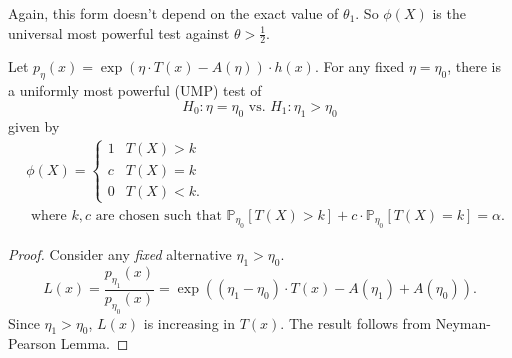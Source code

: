 \documentclass[a4paper]{article}
\begin{document}
\begin{eg}
\begin{center}
	\end{center}
\end{eg}

\begin{remark}
		Again, this form doesn't depend on the exact value of $\theta_1$. So $\phi(X)$ is the universal most powerful test against $\theta > \frac{1}{2}$.
\end{remark}

\begin{thm}
	Let $p_{\eta}(x) = \exp(\eta \cdot T(x) - A(\eta)) \cdot h(x)$. For any fixed $\eta = \eta_0$, there is a uniformly most powerful (UMP) test of
	\begin{equation*}
		H_0: \eta = \eta_0 \text{ vs. } H_1: \eta_1 > \eta_0
	\end{equation*}
	given by
	\begin{equation}
		\begin{aligned}
			& \phi(X) = \left\{
			\begin{array}{ll}
				1 & T(X) > k \\
				c & T(X) = k \\
				0 & T(X) < k.
			\end{array}
			\right.	\\
			& \text{ where $k,c$ are chosen such that } \mathbb{P}_{\eta_0}[T(X) > k] + c \cdot \mathbb{P}_{\eta_0}[T(X) = k] = \alpha.
		\end{aligned}
	\end{equation}
\end{thm}

\begin{proof}
	Consider any \emph{fixed} alternative $\eta_1 > \eta_0$.
	\begin{equation*}
		L(x) = \frac{p_{\eta_1}(x)}{p_{\eta_0}(x)} = \exp((\eta_1 - \eta_0) \cdot T(x) - A(\eta_1) + A(\eta_0)).
	\end{equation*}
	Since $\eta_1 > \eta_0$, $L(x)$ is increasing in $T(x)$. The result follows from Neyman-Pearson Lemma.
\end{proof}
\end{document}
